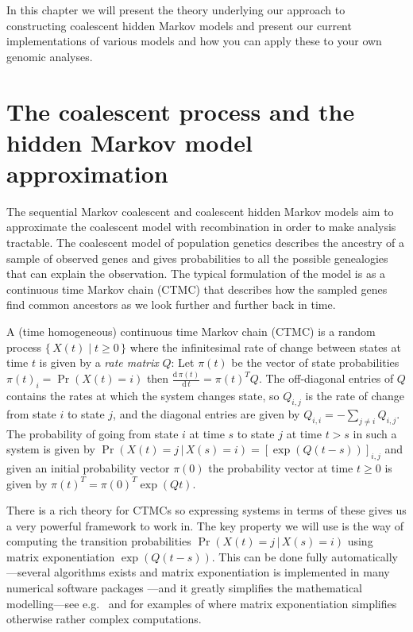 \documentclass[graybox]{svmult}
\begin{document}
In this chapter we will present the theory underlying our approach to constructing coalescent hidden Markov models and present our current implementations of various models and how you can apply these to your own genomic analyses.


\section{The coalescent process and the hidden Markov model approximation}

The sequential Markov coalescent and coalescent hidden Markov models aim to approximate the coalescent model with recombination in order to make analysis tractable. The coalescent model of population genetics describes the ancestry of a sample of observed genes and gives probabilities to all the possible genealogies that can explain the observation. The typical formulation of the model is as a continuous time Markov chain (CTMC) that describes how the sampled genes find common ancestors as we look further and further back in time. 

A (time homogeneous) continuous time Markov chain (CTMC) is a random process $\{\,X(t) \;|\; t \geq 0 \,\}$ where the infinitesimal rate of change between states at time $t$ is given by a \emph{rate matrix} $Q$: Let $\pi(t)$ be the vector of state probabilities $\pi(t)_i = \Pr(X(t)=i)$ then $\frac{\mathrm{d}\,\pi(t)}{\mathrm{d}\,t} = \pi(t)^TQ$. The off-diagonal entries of $Q$ contains the rates at which the system changes state, so $Q_{i,j}$ is the rate of change from state $i$ to state $j$, and the diagonal entries are given by $Q_{i,i} = - \sum_{j\neq i} Q_{i,j}$. The probability of going from state $i$ at time $s$ to state $j$ at time $t>s$ in such a system is given by $\Pr(X(t)=j\,|\,X(s)=i) = \left[\exp\left(Q\left(t-s\right)\right)\right]_{i,j}$ and given an initial probability vector $\pi(0)$ the probability vector at time $t\geq 0$ is given by $\pi(t)^T=\pi(0)^T\exp(Qt)$.

There is a rich theory for CTMCs so expressing systems in terms of these gives us a very powerful framework to work in. The key property we will use is the way of computing the transition probabilities $\Pr(X(t)=j\,|\,X(s)=i)$ using matrix exponentiation $\exp\left(Q\left(t-s\right)\right)$. This can be done fully automatically---several algorithms exists and matrix exponentiation is implemented in many numerical software packages \cite{Moler2003}---and it greatly simplifies the mathematical modelling---see e.g.\ \citet{Hobolth:2011hl} and \citet{Andersen:2013iz} for examples of where matrix exponentiation simplifies otherwise rather complex computations.
\end{document}
